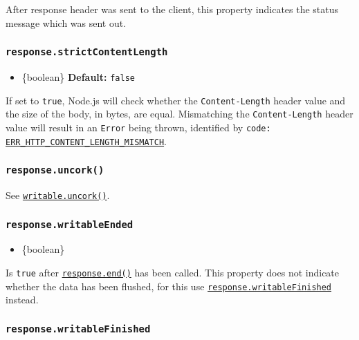 After response header was sent to the client, this property indicates
the status message which was sent out.

\subsubsection{\texorpdfstring{\texttt{response.strictContentLength}}{response.strictContentLength}}\label{response.strictcontentlength}

\begin{itemize}
\tightlist
\item
  \{boolean\} \textbf{Default:} \texttt{false}
\end{itemize}

If set to \texttt{true}, Node.js will check whether the
\texttt{Content-Length} header value and the size of the body, in bytes,
are equal. Mismatching the \texttt{Content-Length} header value will
result in an \texttt{Error} being thrown, identified by \texttt{code:}
\href{errors.md\#err_http_content_length_mismatch}{\texttt{\textquotesingle{}ERR\_HTTP\_CONTENT\_LENGTH\_MISMATCH\textquotesingle{}}}.

\subsubsection{\texorpdfstring{\texttt{response.uncork()}}{response.uncork()}}\label{response.uncork}

See \href{stream.md\#writableuncork}{\texttt{writable.uncork()}}.

\subsubsection{\texorpdfstring{\texttt{response.writableEnded}}{response.writableEnded}}\label{response.writableended}

\begin{itemize}
\tightlist
\item
  \{boolean\}
\end{itemize}

Is \texttt{true} after
\hyperref[responseenddata-encoding-callback]{\texttt{response.end()}}
has been called. This property does not indicate whether the data has
been flushed, for this use
\hyperref[responsewritablefinished]{\texttt{response.writableFinished}}
instead.

\subsubsection{\texorpdfstring{\texttt{response.writableFinished}}{response.writableFinished}}\label{response.writablefinished}

